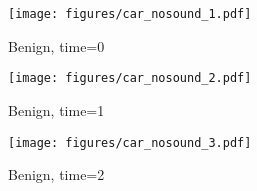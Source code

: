 \begin{figure*}[h]
    \begin{minipage}{0.8\textwidth}
        \centering
        \begin{subfigure}{0.3\textwidth}
            \texttt{[image: figures/car\_nosound\_1.pdf]}
            \caption{Benign, time=0}
            \label{subfig:car_nosound_frame1}
        \end{subfigure}
        \hfill
        \begin{subfigure}{0.3\textwidth}
            \texttt{[image: figures/car\_nosound\_2.pdf]}
            \caption{Benign, time=1}
            \label{subfig:car_nosound_frame2}
        \end{subfigure}
        \hfill
        \begin{subfigure}{0.3\textwidth}
            \texttt{[image: figures/car\_nosound\_3.pdf]}
            \caption{Benign, time=2}
            \label{subfig:car_nosound_frame3}
        \end{subfigure}
        
        \vspace{0.5em} %


\end{minipage}
\end{figure*}
